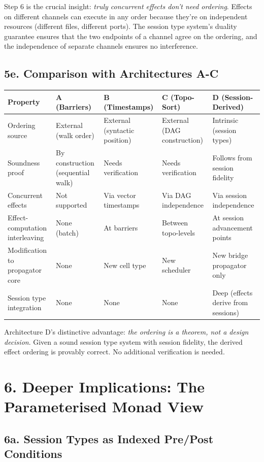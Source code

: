\documentclass[11pt]{article}
\begin{document}
Step 6 is the crucial insight: \emph{truly concurrent effects don't need ordering}.
Effects on different channels can execute in any order because they're on
independent resources (different files, different ports). The session type
system's duality guarantee ensures that the two endpoints of a channel agree
on the ordering, and the independence of separate channels ensures no
interference.
\subsection{5e. Comparison with Architectures A-C}
\label{sec:org9fecd74}

\begin{center}
\begin{tabular}{lllll}
Property & A (Barriers) & B (Timestamps) & C (Topo-Sort) & D (Session-Derived)\\
\hline
Ordering source & External (walk order) & External (syntactic position) & External (DAG construction) & Intrinsic (session types)\\
Soundness proof & By construction (sequential walk) & Needs verification & Needs verification & Follows from session fidelity\\
Concurrent effects & Not supported & Via vector timestamps & Via DAG independence & Via session independence\\
Effect-computation interleaving & None (batch) & At barriers & Between topo-levels & At session advancement points\\
Modification to propagator core & None & New cell type & New scheduler & New bridge propagator only\\
Session type integration & None & None & None & Deep (effects derive from sessions)\\
\end{tabular}
\end{center}

Architecture D's distinctive advantage: \emph{the ordering is a theorem, not a design decision}.
Given a sound session type system with session fidelity, the derived effect ordering
is provably correct. No additional verification is needed.
\section{6. Deeper Implications: The Parameterised Monad View}
\label{sec:org93db646}

\subsection{6a. Session Types as Indexed Pre/Post Conditions}
\label{sec:org54a2beb}
\end{document}
